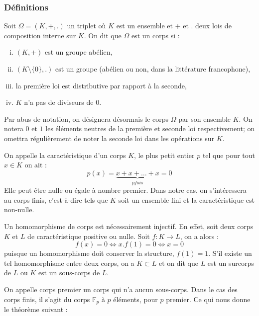 \documentclass[a4paper]{article} %
\numberwithin{equation}{section}
\newcommand\GF[1]{\mathbb{F}_{#1}}
\begin{document}
\subsubsection{Définitions}

Soit $\Omega = (K, +, .)$ un triplet où $K$ est un ensemble et $+$ et $.$ deux
lois de composition interne sur $K$. On dit que $\Omega$ est un corps si : 
\begin{enumerate}[(i)]
\item $(K, +)$ est un groupe abélien,
\item $(K\setminus\lbrace0\rbrace,.)$ est un groupe (abélien ou non, dans la 
littérature francophone),
\item la première loi est distributive par rapport à la seconde,
\item $K$ n'a pas de diviseurs de $0$.
\end{enumerate}
Par abus de notation, on désignera désormais le corps $\Omega$ par son ensemble
$K$. On notera $0$ et $1$ les éléments neutres de la première et seconde loi 
respectivement; on omettra régulièrement de noter la seconde loi dans les 
opérations sur $K$.\par
On appelle la caractéristique d'un corps $K$, le plus petit entier $p$ tel que pour 
tout $x\in K$ on ait :
\[p(x) = \underbrace{x + x + \dots + x}_{p fois} = 0\]
Elle peut être nulle ou égale à nombre premier. Dans notre cas, on s'intéressera
au corps finis, c'est-à-dire tels que $K$ soit un ensemble fini et la caractéristique 
est non-nulle.\\\par
Un homomorphisme de corps est nécessairement injectif. En effet, soit deux corps 
$K$ et $L$ de caractéristique positive ou nulle. Soit $f : K \to L$, on a alors : 
\[f(x) = 0 \Leftrightarrow x.f(1) = 0 \Leftrightarrow x = 0\]
puisque un homomorphisme doit conserver la structure, $f(1) = 1$. S'il existe un
tel homomorphisme entre deux corps, on a $K\subset L$ et on dit que $L$ est un
surcorps de $L$ ou $K$ est un sous-corps de $L$.\par
On appelle corps premier un corps qui n'a aucun sous-corps. Dans le cas des
corps finis, il s'agit du corps $\GF{p}$ à $p$ éléments, pour $p$ premier. Ce
qui nous donne le théorème suivant :
\end{document}
